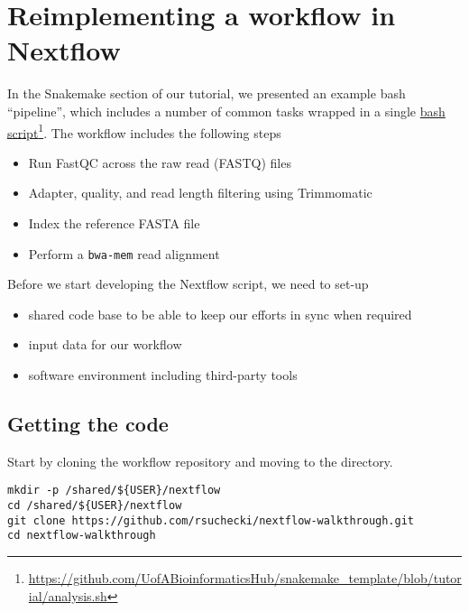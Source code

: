 \newpage


\section{Reimplementing a workflow in Nextflow}

In the Snakemake section of our tutorial, we presented an example bash ``pipeline'', which 
includes a number of common tasks wrapped in a single 
\href{https://github.com/UofABioinformaticsHub/snakemake_template/blob/tutorial/analysis.sh}{bash script}\footnote{\url{https://github.com/UofABioinformaticsHub/snakemake_template/blob/tutorial/analysis.sh}}.
The workflow includes the following steps

\begin{itemize}
  \item Run FastQC across the raw read (FASTQ) files
  \item Adapter, quality, and read length filtering using Trimmomatic
  \item Index the reference FASTA file
  \item Perform a \texttt{bwa-mem} read alignment
\end{itemize}

Before we start developing the Nextflow script, we need to set-up 
\begin{itemize}
  \item shared code base to be able to keep our efforts in sync when required
  \item input data for our workflow
  \item software environment including third-party tools
\end{itemize}



\subsection{Getting the code}

\begin{steps}
Start by cloning the workflow repository and moving to the directory.

\begin{lstlisting}
mkdir -p /shared/${USER}/nextflow
cd /shared/${USER}/nextflow
git clone https://github.com/rsuchecki/nextflow-walkthrough.git 
cd nextflow-walkthrough
\end{lstlisting}
\end{steps}



